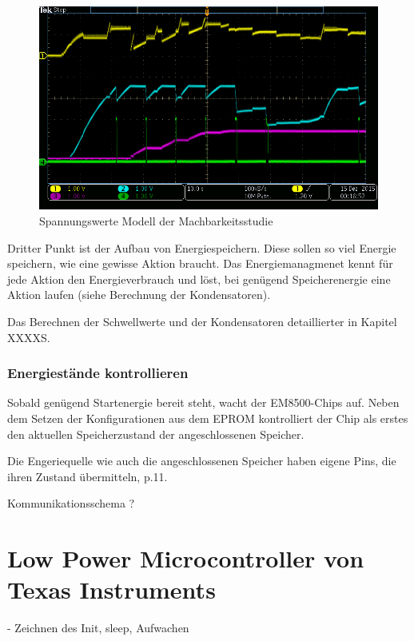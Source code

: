 \begin{figure}
    \includegraphics[width=15cm]{2TheoretischeGrundlagen/imag/falscheRegelung.png}
    \caption{Spannungswerte Modell der Machbarkeitsstudie}\label{falscheRegelung} 
\end{figure}

Dritter Punkt ist der Aufbau von Energiespeichern. Diese sollen so viel Energie speichern, wie eine gewisse Aktion braucht. Das Energiemanagmenet kennt für jede Aktion den Energieverbrauch und löst, bei genügend Speicherenergie eine Aktion laufen (siehe Berechnung der Kondensatoren).

Das Berechnen der Schwellwerte und der Kondensatoren detaillierter in Kapitel XXXXS.






\subsubsection{Energiestände kontrollieren}

Sobald genügend Startenergie bereit steht, wacht der EM8500-Chips auf. Neben dem Setzen der Konfigurationen aus dem EPROM kontrolliert der Chip als erstes den aktuellen Speicherzustand der angeschlossenen Speicher.

Die Engeriequelle wie auch die angeschlossenen Speicher haben eigene Pins, die ihren Zustand übermitteln\cite{datasheet_EM85}, p.11. 

Kommunikationsschema ? 

\section{Low Power Microcontroller von Texas Instruments}
- Zeichnen des Init, sleep, Aufwachen

